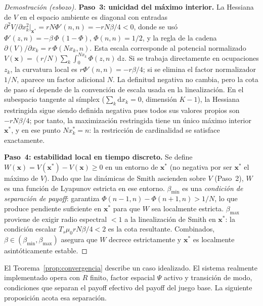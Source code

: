 \begin{proof}[Demostración (esbozo)]
\textbf{Paso~3: unicidad del máximo interior.}
La Hessiana de $V$ en el espacio ambiente es diagonal con entradas
$\partial^2 V / \partial x_k^2|_{\mathbf{x}^*} = r N\Phi'(n,n) = -rN\beta/4 < 0$,
donde se usó $\Phi'(z,n) = -\beta\,\Phi\,(1{-}\Phi)$, $\Phi(n,n) = 1/2$, y la
regla de la cadena $\partial (V)/\partial x_k = r\,\Phi(Nx_k,n)$.
Esta escala corresponde al potencial normalizado
$V(\mathbf{x})=(r/N)\sum_k\int_0^{Nx_k}\Phi(z,n)\,\mathrm{d}z$. Si se trabaja
directamente en ocupaciones $z_k$, la curvatura local es $r\Phi'(n,n)=-r\beta/4$;
si se elimina el factor normalizador $1/N$, aparece un factor adicional $N$. La
definitud negativa no cambia, pero la cota de paso sí depende de la convención de
escala usada en la linealización.
En el subespacio tangente al símplex ($\sum_k \mathrm{d}x_k = 0$, dimensión $K{-}1$),
la Hessiana restringida sigue siendo definida negativa pues todos sus valores propios
son $-rN\beta/4$; por tanto, la maximización restringida tiene un único máximo
interior $\mathbf{x}^*$, y en ese punto $Nx_k^* = n$: la restricción de cardinalidad
se satisface exactamente.

\textbf{Paso~4: estabilidad local en tiempo discreto.}
Se define $W(\mathbf{x}) = V(\mathbf{x}^*) - V(\mathbf{x}) \geq 0$ en un entorno
de $\mathbf{x}^*$ (no negativa por ser $\mathbf{x}^*$ el máximo de $V$).
Dado que las dinámicas de Smith ascienden sobre $V$ (Paso~2), $W$ es una
función de Lyapunov estricta en ese entorno.
$\beta_{\min}$ es una \emph{condición de separación de payoff}: garantiza
$\Phi(n{-}1,n)-\Phi(n{+}1,n) > 1/N$, lo que produce pendiente suficiente en $\mathbf{x}^*$
para que $W$ sea localmente estricta.
$\beta_{\max}$ proviene de exigir radio espectral $< 1$ a la linealización de Smith
en $\mathbf{x}^*$: la condición escalar $T_s\mu_0 r N\beta/4 < 2$ es la cota resultante.
Combinados, $\beta \in (\beta_{\min},\beta_{\max})$ asegura que $W$ decrece estrictamente
y $\mathbf{x}^*$ es localmente asintóticamente estable.
\end{proof}

El Teorema~\ref{prop:convergencia} describe un caso idealizado. El sistema
realmente implementado opera con $R$ finito, factor espacial $\Psi$ activo y
transición de modo, condiciones que separan el payoff efectivo del payoff del juego
base. La siguiente proposición acota esa separación.

